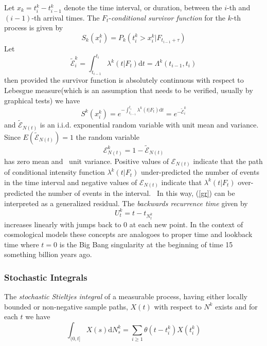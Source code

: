 \documentclass{amsart}
\newcommand{\mathd}{\mathrm{d}}
\newcommand{\tmem}[1]{{\em #1\/}}
\begin{document}
Let $x_k = t_i^k - t_{i - 1}^k$ denote the time interval, or duration, between
the $i$-th and $( i - 1)$-th arrival times. The $F_t$-{\tmem{conditional
survivor function}} for the $k$-th process is given by
\begin{equation}
  S_k ( x_i^k) = P_k ( t_i^k > x_i^k | F_{t_{i - 1} + \tau})
\end{equation}
Let
\[ \tilde{\mathcal{E}}_i^k = \int_{t_{i - 1}}^{t_i} \lambda^k ( t | F_t)
   \mathd t = \Lambda^k ( t_{i - 1}, t_i)_{} \label{gr} \]
then provided the survivor function is absolutely continuous with respect to
Lebesgue measure(which is an assumption that needs to be verified, usually by
graphical tests) we have
\begin{equation}
  S^k ( x_i^k) = e^{- \int_{t_{i - 1}}^{t_i} \lambda^k ( t | F_t) \mathd t} =
  e^{- \tilde{\mathcal{E}}_i^k} \label{S}
\end{equation}
and $\tilde{\mathcal{E}}_{N ( t)}$ is an i.i.d. exponential random variable
with unit mean and variance. Since $E ( \tilde{\mathcal{E}}_{N ( t)}) = 1$ the
random variable
\begin{equation}
  \mathcal{E}_{N ( t)}^k = 1 - \tilde{\mathcal{E}}_{N ( t)}
\end{equation}
has zero mean and \ unit variance. Positive values of $\mathcal{E}_{N ( t)}$
indicate that the path of conditional intensity function $\lambda^k ( t |
F_t)$ under-predicted the number of events in the time interval and negative
values of $\mathcal{E}_{N ( t)}$ indicate that $\lambda^k ( t | F_t)$
over-predicted the number of events in the interval. \ In this way, (\ref{gr})
can be interpreted as a generalized residual. The {\tmem{backwards recurrence
time}} given by
\begin{equation}
  U_t^k = t - t_{N_t^k}
\end{equation}
increases linearly with jumps back to 0 at each new point. In the context of
cosmological models these concepts are analogoes to proper time and lookback
time where $t = 0$ is the Big Bang singularity at the beginning of time 15
something billion years ago.

\subsubsection{Stochastic Integrals}

The {\tmem{stochastic Stieltjes
integral}}{\cite[2.1]{bowsher2007modelling}}{\cite[2.2]{karr}} of a measurable
process, having either locally bounded or non-negative sample paths, $X ( t)$
with respect to $N^k$ exists and for each $t$ we have
\begin{equation}
  \int_{( 0, t]} X ( s) \mathd N^k_s = \sum_{i \geqslant 1} \theta ( t -
  t_i^k) X ( t_i^k)
\end{equation}
\end{document}
